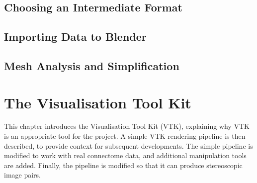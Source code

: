 \documentclass[MSc,paper=a4,pagesize=auto]{icldt}
\begin{document}
\section{Choosing an Intermediate Format}

\section{Importing Data to Blender}

\section{Mesh Analysis and Simplification}

\chapter{The Visualisation Tool Kit}
This chapter introduces the Visualisation Tool Kit (VTK), explaining why VTK is an appropriate tool for the project. A simple VTK rendering pipeline is then described, to provide context for subsequent developments. The simple pipeline is modified to work with real connectome data, and additional manipulation tools are added. Finally, the pipeline is modified so that it can produce stereoscopic image pairs.
\end{document}
